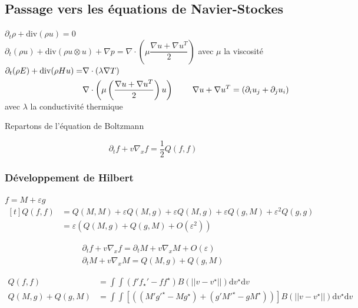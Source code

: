 \documentclass[12pt,a4paper]{article}
\begin{document}
\subsection{Passage vers les équations de Navier-Stockes}

$\partial_t \rho + \mathrm{div}(\rho u) = 0$\\
$\partial_t(\rho u) + \mathrm{div}(\rho u\otimes u) + \nabla p = \nabla\cdot\left(\mu \dfrac{\nabla u + \nabla u^T}2\right)$ avec $\mu$ la viscosité\\
$\begin{aligned}[t]
	\partial_t(\rho E) + \mathrm{div}(\rho H u) =& \nabla\cdot\left(\lambda\nabla T\right)\\
	&\nabla\cdot\left(\mu\left(\dfrac{\nabla u + \nabla u^T}2\right)u\right) & \hspace{.5cm} \nabla u + \nabla u ^T = \left(\partial_iu_j+\partial_ju_i\right)
\end{aligned}$ \hspace*{-5cm} avec $\lambda$ la conductivité thermique
	
Repartons de l'équation de Boltzmann

\[
\partial_t f + v \nabla_x f = \frac12 Q(f,f)
\]

\subsubsection{Développement de Hilbert}
$f = M + \varepsilon g$ \hspace{1cm} $\begin{aligned}[t]
	Q(f,f) &= Q(M,M) + \varepsilon Q(M,g) + \varepsilon Q(M,g) + \varepsilon Q(g,M) + \varepsilon^2 Q(g,g)\\
	&= \varepsilon(Q(M,g)+Q(g,M)+O(\varepsilon^2))
\end{aligned}$

\[
\begin{gathered}
	\partial_t f + v\nabla_x f = \partial_t M + v\nabla_x M + O(\varepsilon)\\
	\partial_t M + v\nabla_x M = Q(M,g) + Q(g,M)
\end{gathered}
\]

$\begin{aligned}
	Q(f,f) &= \displaystyle\int\int \left(f'f_\star' - ff^\star\right)B(|\!|v-v^\star|\!|)\mathrm dv^\star\mathrm dv\\
Q(M,g)+Q(g,M) &= \displaystyle\int\int\left[\left((M'g'^\star-Mg^\star)+(g'M'^\star-gM^\star)\right)\right]B(|\!|v-v^\star|\!|)\mathrm dv^\star\mathrm dv
\end{aligned}$
	 
\end{document}
